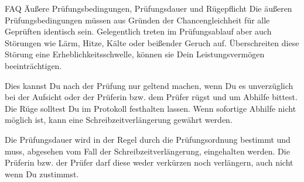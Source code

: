 \begin{artikel}{FAQ Äußere Prüfungsbedingungen, Prüfungsdauer und Rügepflicht}
Die äußeren Prüfungsbedingungen müssen aus Gründen der Chancengleichheit für alle Geprüften identisch sein. Gelegentlich treten im Prüfungsablauf aber auch Störungen wie Lärm, Hitze, Kälte oder beißender Geruch auf. Überschreiten diese Störung eine Erheblichkeitsschwelle, können sie Dein Leistungsvermögen beeinträchtigen.

Dies kannst Du nach der Prüfung nur geltend machen, wenn Du es unverzüglich bei der Aufsicht oder der Prüferin bzw. dem Prüfer rügst und um Abhilfe bittest. Die Rüge solltest Du im Protokoll festhalten lassen. Wenn sofortige Abhilfe nicht möglich ist, kann eine Schreibzeitverlängerung gewährt werden.

Die Prüfungsdauer wird in der Regel durch die Prüfungsordnung bestimmt und muss, abgesehen vom Fall der Schreibzeitverlängerung, eingehalten werden. Die Prüferin bzw. der Prüfer darf diese weder verkürzen noch verlängern, auch nicht wenn Du zustimmst.
\end{artikel}
